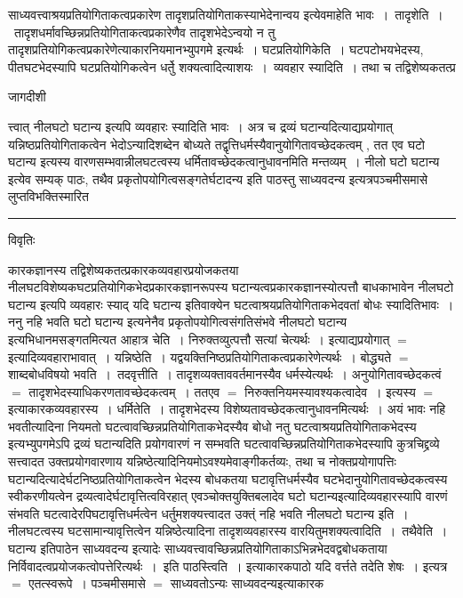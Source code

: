 \documentclass[10pt, openany]{book}
\begin{document}
{साध्यवत्त्वाश्रयप्रतियोगिताकत्वप्रकारेण तादृशप्रतियोगिताकस्याभेदेनान्वय इत्येवमाहेति भावः~।~{\la तादृशेति~।}~तादृशधर्मावच्छिन्नप्रतियोगिताकत्वप्रकारेणैव तादृशभेदेऽन्वयो न तु तादृशप्रतियोगिकत्वप्रकारेणेत्याकारनियमानभ्युपगमे  इत्यर्थः~।
घटप्रतियोगिकेति~। घटपटोभयभेदस्य, पीतघटभेदस्यापि घटप्रतियोगिकत्वेन धर्तेु  शक्यत्वादित्याशयः~।~{\la व्यवहार स्यादिति~।} तथा च तद्विशेष्यकतत्प्र 
\newpage
\begin{center} जागदीशी \end{center}
{\la त्त्वात् नीलघटो घटान्य इत्यपि व्यवहारः स्यादिति भावः~। अत्र च द्रव्यं घटान्यदित्याद्यप्रयोगात् यन्निष्ठप्रतियोगिताकत्वेन भेदोऽन्यादिशब्देन बोध्यते तद्वृत्तिधर्मस्यैवानुयोगितावच्छेदकत्वम् , तत एव घटो घटान्य इत्यस्य वारणसम्भवान्नीलघटत्वस्य धर्मितावच्छेदकत्वानुधावनमिति मन्तव्यम्~।
{\qt नीलो घटो घटान्य} इत्येव सम्यक् पाठः, तथैव प्रकृतोपयोगित्वसङ्गतेर्घटादन्य इति पाठस्तु साध्यवदन्य इत्यत्रपञ्चमीसमासे लुप्तविभक्तिस्मारित}\\
\hrule
\begin{center}     विवृतिः \end{center}
कारकज्ञानस्य तद्विशेष्यकतत्प्रकारकव्यवहारप्रयोजकतया नीलघटविशेष्यकघटप्रतियोगिकभेदप्रकारकज्ञानरूपस्य घटान्यत्वप्रकारकज्ञानस्योत्पत्तौ बाधकाभावेन
नीलघटो घटान्य इत्यपि व्यवहारः स्याद् यदि घटान्य इतिवाक्येन घटत्वाश्रयप्रतियोगिताकभेदवतां बोधः स्यादितिभावः~। ननु नहि भवति घटो घटान्य  इत्यनेनैव प्रकृतोपयोगित्वसंगतिसंभवे नीलघटो घटान्य इत्यभिधानमसङ्गतमित्यत  आहात्र चेति~। निरुक्तव्युत्पत्तौ सत्यां चेत्यर्थः~। इत्याद्यप्रयोगात् $=$ इत्यादिव्यवहाराभावात्~। यन्निष्ठेति~। यद्वयक्तिनिष्ठप्रतियोगिताकत्वप्रकारेणेत्यर्थः~। बोद्ध्यते $=$ शाब्दबोधविषयो भवति~।~{\la तदवृत्तीति~।} तादृशव्यक्ताववर्तमानस्यैव धर्मस्येत्यर्थः~। अनुयोगितावच्छेदकत्वं $=$ तादृशभेदस्याधिकरणतावच्छेदकत्वम्~। ततएव $=$ निरुक्तनियमस्यावश्यकत्वादेव~। इत्यस्य $=$ इत्याकारकव्यवहारस्य~। {\la धर्मितेति~।} तादृशभेदस्य विशेष्यतावच्छेदकत्वानुधावनमित्यर्थः~। अयं भावः नहि भवतीत्यादिना नियमतो घटत्वावच्छिन्नप्रतियोगिताकभेदस्यैव बोधो नतु घटत्वाश्रयप्रतियोगिताकभेदस्य इत्यभ्युपगमेऽपि द्रव्यं घटान्यदिति प्रयोगवारणं न सम्भवति घटत्वावच्छिन्नप्रतियोगिताकभेदस्यापि कुत्रचिद्द्रव्ये सत्त्वादत उक्तप्रयोगवारणाय यन्निष्ठेत्यादिनियमोऽवश्यमेवाङ्गीकर्तव्यः, तथा च नोक्तप्रयोगापत्तिः
घटान्यदित्यादेर्घटनिष्ठप्रतियोगिताकत्वेन भेदस्य बोधकतया घटावृत्तिधर्मस्यैव घटभेदानुयोगितावच्छेदकत्वस्य स्वीकरणीयत्वेन द्रव्यत्वादेर्घटावृत्तित्वविरहात्
एवञ्चोक्तयुक्तिबलादेव घटो घटान्य\textendash इत्यादिव्यवहारस्यापि वारणं संभवति घटत्वादेरपिघटावृत्तिधर्मत्वेन धर्तुमशक्यत्त्वादत उक्त्ं {\qt नहि भवति नीलघटो घटान्य } इति~। नीलघटत्वस्य घटसामान्यावृत्तित्वेन यन्निष्ठेत्यादिना तादृशव्यवहारस्य वारयितुमशक्यत्वादिति~।~{\la तथैवेति~।} {\qt घटान्य} इतिपाठेन साध्यवदन्य इत्यादेः साध्यवत्त्वावच्छिन्नप्रतियोगिताकाऽभिन्नभेदवद्वबोधकताया निर्विवादत्वप्रयोजकत्वोपत्तेरित्यर्थः~।~{\la इति पाठस्त्विति~।} इत्याकारकपाठो यदि वर्त्तते तदेति शेषः~। इत्यत्र $=$ एतत्स्वरूपे~। पञ्चमीसमासे $=$  साध्यवतोऽन्यः साध्यवदन्यइत्याकारक
}
\end{document}

